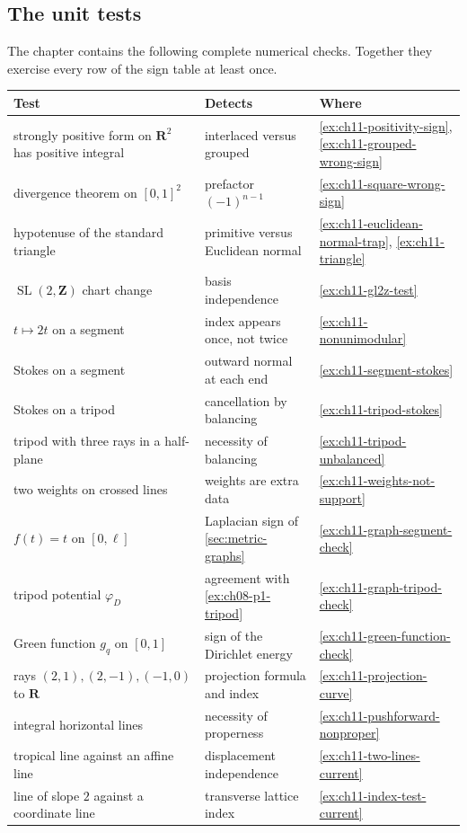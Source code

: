 \subsection{The unit tests}
\label{sec:ch11-unit-tests}

The chapter contains the following complete numerical checks.  Together they
exercise every row of the sign table at least once.

\begin{center}
\small
\begin{tabular}{p{}|p{}|p{}}
\textbf{Test}&\textbf{Detects}&\textbf{Where}\\ \hline
strongly positive form on
  $\mathbf R^2$ has positive integral
  &interlaced versus grouped
  &\cref{ex:ch11-positivity-sign},
   \cref{ex:ch11-grouped-wrong-sign}\\
divergence theorem on $[0,1]^2$
  &prefactor $(-1)^{n-1}$
  &\cref{ex:ch11-square-wrong-sign}\\
hypotenuse of the standard triangle
  &primitive versus Euclidean normal
  &\cref{ex:ch11-euclidean-normal-trap},
   \cref{ex:ch11-triangle}\\
$\operatorname{SL}(2,\mathbf Z)$ chart change
  &basis independence
  &\cref{ex:ch11-gl2z-test}\\
$t\mapsto2t$ on a segment
  &index appears once, not twice
  &\cref{ex:ch11-nonunimodular}\\
Stokes on a segment
  &outward normal at each end
  &\cref{ex:ch11-segment-stokes}\\
Stokes on a tripod
  &cancellation by balancing
  &\cref{ex:ch11-tripod-stokes}\\
tripod with three rays in a half-plane
  &necessity of balancing
  &\cref{ex:ch11-tripod-unbalanced}\\
two weights on crossed lines
  &weights are extra data
  &\cref{ex:ch11-weights-not-support}\\
$f(t)=t$ on $[0,\ell]$
  &Laplacian sign of
   \cref{sec:metric-graphs}
  &\cref{ex:ch11-graph-segment-check}\\
tripod potential $\varphi_D$
  &agreement with
   \cref{ex:ch08-p1-tripod}
  &\cref{ex:ch11-graph-tripod-check}\\
Green function $g_q$ on $[0,1]$
  &sign of the Dirichlet energy
  &\cref{ex:ch11-green-function-check}\\
rays $(2,1),(2,-1),(-1,0)$ to $\mathbf R$
  &projection formula and index
  &\cref{ex:ch11-projection-curve}\\
integral horizontal lines
  &necessity of properness
  &\cref{ex:ch11-pushforward-nonproper}\\
tropical line against an affine line
  &displacement independence
  &\cref{ex:ch11-two-lines-current}\\
line of slope $2$ against a coordinate line
  &transverse lattice index
  &\cref{ex:ch11-index-test-current}
\end{tabular}
\end{center}

